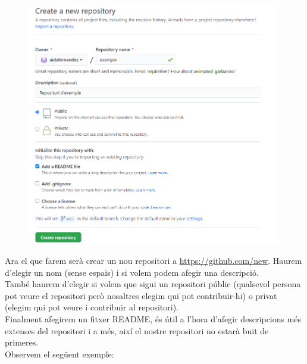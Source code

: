 \documentclass[9pt,a4paper]{article}
\begin{document}
\begin{figure}
	\centering
	\includegraphics[width=11cm]{create}
\end{figure}

Ara el que farem serà crear un nou repositori a \url{https://github.com/new}.
Haurem d'elegir un nom (sense espais) i si volem podem afegir una descripció.\\
També haurem d'elegir si volem que sigui un repositori públic (qualsevol persona pot veure el repositori però nosaltres elegim qui pot contribuir-hi) o privat (elegim qui pot veure i contribuir al repositori). \\
Finalment afegirem un fitxer README, és útil a l'hora d'afegir descripcions més extenses del repositori i a més, així el nostre repositori no estarà buit de primeres.\\

Observem el següent exemple:

\clearpage
\end{document}
